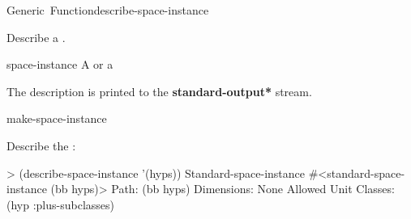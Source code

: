 \documentclass[10pt,twoside,english,pdftex]{article}
\begin{document}
\begin{functiondoc}{Generic~Function}{describe-space-instance}%
  {}
%
%

\fnsyntax

\fnpurpose Describe a .

\fnmethods
{}%
  {\code{(} }
%
  {\code{(} }

\fnpackage {}

\fnmodule {}

\fnargs
\begin{args}{space-instance}
 A  or a 
\end{args}

\fndescription
{}%
The description is printed to the {\bf *standard-output*} stream.

\begin{alsos}{make-space-instance}
\end{alsos}

\fnexample
Describe the  :
\begin{example}
> (describe-space-instance '(hyps))
  Standard-space-instance #<standard-space-instance (bb hyps)>
    Path: (bb hyps)
    Dimensions: None
    Allowed Unit Classes:
      (hyp :plus-subclasses)
\end{example}

\end{functiondoc}

\end{document}
